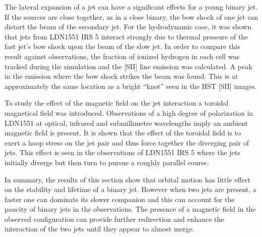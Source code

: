 The lateral expansion of a jet can have a significant effects for a young binary
jet. If the sources are close together, as in a close
binary, the bow shock of one jet can distort the beam of the secondary jet. 
For the hydrodynamic case, it was shown that jets from LDN1551 IRS 5 interact strongly due to thermal pressure of the fast jet's bow shock upon the beam of the slow jet.
In order to compare this result against observations, the fraction of ionized
hydrogen in each cell was tracked during the simulation and the [SII] line
emission was calculated. A peak in the emission where the bow shock strikes the
beam was found. This is at approximately the same location as a bright ``knot''
seen in the HST [SII] images.

To study the effect of the magnetic field on the jet interaction a toroidal
magnetical field was introduced.
Observations of a high degree of polarization in LDN1551 at optical, infrared
and submillimetre wavelengths imply an ambient magnetic field is
present.
It is shown that the effect of the toroidal field is to exert a hoop stress on the jet pair and thus force together the diverging pair of jets.
This effect is seen in the observations of LDN1551 IRS 5 where the jets
initially diverge but then turn to pursue a roughly parallel course.

In summary, the results of this section show that orbital motion has little
effect on the stability and lifetime of a binary jet. However when two jets are
present, a faster one can dominate its slower companion and this can account for
the paucity of binary jets in the observations. The presence of a magnetic field
in the observed configuration can provide further redirection and enhance the
interaction of the two jets until they appear to almost merge.

